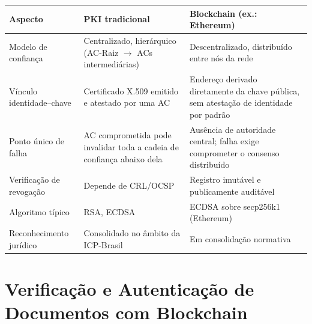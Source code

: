 \documentclass[
    12pt,
    a4paper,
    oneside,
    chapter=TITLE,
    section=TITLE,
    subsection=TITLE,
    subsubsection=TITLE,
    sumario=tradicional,
    english,
    brazil
]{abntex2}
\begin{document}
\FloatBarrier
\begin{quadro}[htb]
    \caption{Comparação entre a PKI tradicional e a blockchain}
    \label{quadro:pki-blockchain}
    \centering
    \begin{tabular}{>{\raggedright\arraybackslash}p{3.3cm}>{\raggedright\arraybackslash}p{4.9cm}>{\raggedright\arraybackslash}p{4.9cm}}
        \toprule
        \textbf{Aspecto} & \textbf{PKI tradicional} & \textbf{Blockchain (ex.: Ethereum)} \\
        \midrule
        Modelo de confiança &
        Centralizado, hierárquico (AC-Raiz $\rightarrow$ ACs intermediárias) \cite{cooper2008} &
        Descentralizado, distribuído entre nós da rede \cite{halder2024} \\
        \addlinespace
        Vínculo identidade--chave &
        Certificado X.509 emitido e atestado por uma AC \cite{cooper2008} &
        Endereço derivado diretamente da chave pública, sem atestação de identidade por padrão \\
        \addlinespace
        Ponto único de falha &
        AC comprometida pode invalidar toda a cadeia de confiança abaixo dela \cite{halder2024} &
        Ausência de autoridade central; falha exige comprometer o consenso distribuído \\
        \addlinespace
        Verificação de revogação &
        Depende de CRL/OCSP \cite{cooper2008} &
        Registro imutável e publicamente auditável \cite{halder2024} \\
        \addlinespace
        Algoritmo típico &
        RSA, ECDSA \cite{nist2023} &
        ECDSA sobre secp256k1 (Ethereum) \\
        \addlinespace
        Reconhecimento jurídico &
        Consolidado no âmbito da ICP-Brasil \cite{brasil2001, brasil2020} &
        Em consolidação normativa \\
        \bottomrule
    \end{tabular}
\end{quadro}
\FloatBarrier

\section{Verificação e Autenticação de Documentos com Blockchain}
\end{document}
